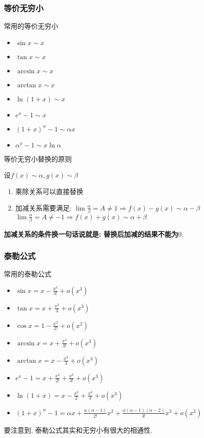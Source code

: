 \subsubsection{等价无穷小}
{\kaishu 常用的等价无穷小}\vspace{-1em}
\begin{multicols}{2}
\begin{itemize}
\item $ \sin x\sim x $
\item $ \tan x\sim x $
\item $ \arcsin x\sim x $
\item $ \arctan x\sim x $
\item $ \ln(1+x)\sim x $
\item $ e^{x}-1\sim x $
\item $ (1+x)^{\alpha}-1\sim \alpha x $
\item $ \alpha^{x}-1\sim x\ln \alpha $
\end{itemize}
\end{multicols}
{\kaishu 等价无穷小替换的原则}\par \vspace{.5em}
设$ f(x)\sim \alpha, g(x)\sim \beta $
\begin{enumerate}
\item 乘除关系可以直接替换
\item 加减关系需要满足:
\subitem $ \lim\limits \frac{\alpha}{\beta}=A\neq 1\Rightarrow f(x)-g(x)\sim \alpha-\beta $
\subitem $ \lim\limits \frac{\alpha}{\beta}=A\neq -1\Rightarrow f(x)+g(x)\sim \alpha+\beta $
\end{enumerate}\par
\textbf{加减关系的条件换一句话说就是: 替换后加减的结果不能为$ 0 $}.
\subsubsection{泰勒公式}
{\kaishu 常用的泰勒公式}\vspace{-1em}
\begin{multicols}{2}
\begin{itemize}
\item $ \sin x=x-\frac{x^{3}}{3!}+o(x^{3}) $
\item $ \tan x=x+\frac{x^{3}}{3}+o(x^{3}) $
\item $ \cos x=1-\frac{x^{2}}{2!}+o(x^{2}) $
\item $ \arcsin x=x+\frac{x^{3}}{3!}+o(x^{3}) $
\item $ \arctan x=x-\frac{x^{3}}{3}+o(x^{3}) $
\item $ e^{x}-1=x+\frac{x^{2}}{2!}+\frac{x^{3}}{3!}+o(x^{3}) $
\item $ \ln(1+x)=x-\frac{x^{2}}{2}+\frac{x^{3}}{3}+o(x^{3}) $
\item $ (1+x)^{\alpha}-1=\alpha x+\frac{\alpha(\alpha-1)}{2!}x^{2}+\frac{\alpha(\alpha-1)(\alpha-2)}{3!}x^{3}+o(x^{3}) $
\end{itemize}
\end{multicols}\par
要注意到, 泰勒公式其实和无穷小有很大的相通性.
